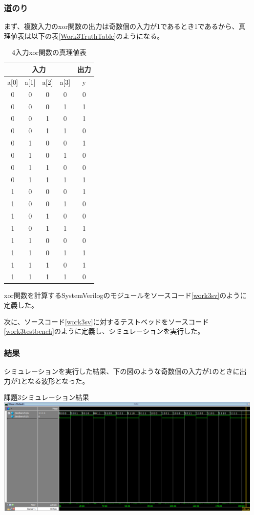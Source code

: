 \documentclass[a4paper]{jarticle}
\begin{document}
\subsubsection{道のり}
まず、複数入力のxor関数の出力は奇数個の入力が1であるとき1であるから、真理値表は以下の表\ref{Work3TruthTable}のようになる。
\begin{table}[ht]
	\begin{center}
		\caption{4入力xor関数の真理値表}
		\label{Work3ruthTable}
		\begin{tabular}{|c|c|c|c||c|}
			\hline
			\multicolumn{4}{|c|}{入力} & \multicolumn{1}{|c|}{出力}\\ \hline\hline
			a[0]	&a[1]	&a[2]	&a[3]	&y\\	\hline\hline
			0	&0	&0	&0	&0\\	\hline
			0	&0	&0	&1	&1\\	\hline
			0	&0	&1	&0	&1\\	\hline
			0	&0	&1	&1	&0\\	\hline
			0	&1	&0	&0	&1\\	\hline
			0	&1	&0	&1	&0\\	\hline
			0	&1	&1	&0	&0\\	\hline
			0	&1	&1	&1	&1\\	\hline
			1	&0	&0	&0	&1\\	\hline
			1	&0	&0	&1	&0\\	\hline
			1	&0	&1	&0	&0\\	\hline
			1	&0	&1	&1	&1\\	\hline
			1	&1	&0	&0	&0\\	\hline
			1	&1	&0	&1	&1\\	\hline
			1	&1	&1	&0	&1\\	\hline
			1	&1	&1	&1	&0\\	\hline
		\end{tabular}
	\end{center}
\end{table}
xor関数を計算するSystemVerilogのモジュールをソースコード\ref{work3sv}のように定義した。

次に、ソースコード\ref{work3sv}に対するテストベッドをソースコード\ref{work3testbench}のように定義し、シミュレーションを実行した。

\subsubsection{結果}
シミュレーションを実行した結果、下の図のような奇数個の入力が1のときに出力が1となる波形となった。
\begin{center}
	課題3シミュレーション結果
	\includegraphics[width=15cm]{3-m.PNG}
\end{center}
\end{document}
